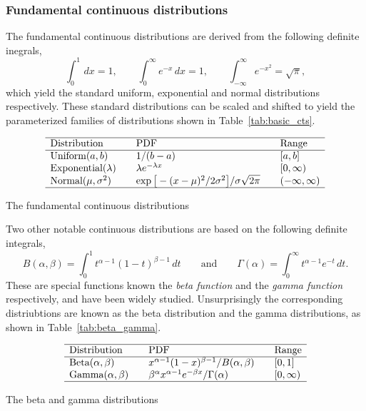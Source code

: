 
\subsubsection*{Fundamental continuous distributions}

The fundamental continuous distributions are derived from the following definite inegrals,
\[
\int_0^1\,dx = 1,\qquad \int_0^{\infty} e^{-x}\,dx = 1, \qquad \int_{-\infty}^{\infty} e^{-x^2} = \sqrt{\pi},
\]
which yield the standard uniform, exponential and normal distributions respectively. These standard distributions can be scaled and shifted to yield the parameterized families of distributions shown in Table~\ref{tab:basic_cts}.
\begin{table}[ht]
\[\begin{array}{lclcl}\hline
\text{Distribution} 		& & \text{PDF}											& & \text{Range}	\\ \hline
\text{Uniform}(a,b)			& & 1/(b-a)												& & [a,b]			\\
\text{Exponential}(\lambda)	& & \lambda e^{-\lambda x} 								& & [0,\infty)		\\
\text{Normal}(\mu,\sigma^2)	& & \exp\big[-(x-\mu)^2/2\sigma^2\big]/\sigma\sqrt{2\pi}& & (-\infty,\infty)\\ \hline
\end{array}\]
\caption{The fundamental continuous distributions\label{tab:basic_cts}}
\end{table}

Two other notable continuous distributions are based on the following definite integrals,
\[
B(\alpha,\beta) = \int_0^1 t^{\alpha-1}(1-t)^{\beta-1}\,dt
\qquad\text{and}\qquad
\Gamma(\alpha) = \int_0^{\infty} t^{\alpha-1}e^{-t}\,dt.
\]
These are special functions known the \emph{beta function} and the \emph{gamma function} respectively, and have been widely studied. Unsurprisingly the corresponding distriubtions are known as the beta distribution and the gamma distributions, as shown in Table~\ref{tab:beta_gamma}.
\begin{table}[ht]
\[\begin{array}{lclcl}\hline
\text{Distribution} 		& & \text{PDF}											& & \text{Range}	\\ \hline
\text{Beta}(\alpha,\beta)	& & x^{\alpha-1}(1-x)^{\beta-1}/B(\alpha,\beta)		& & [0,1]			\\
\text{Gamma}(\alpha,\beta)		& & \beta^{\alpha}x^{\alpha-1}e^{-\beta x}/\Gamma(\alpha)& & [0,\infty)		\\ \hline
\end{array}\]
\caption{The beta and gamma distributions\label{tab:beta_gamma}}
\end{table}

